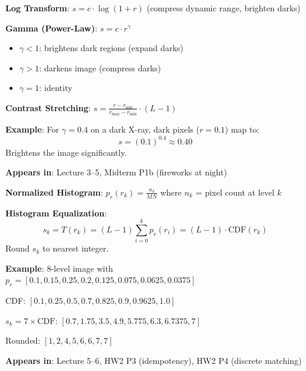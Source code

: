 \documentclass[10pt]{article}
\begin{document}

\begin{conceptbox}

\begin{formulabox}
\textbf{Log Transform}: $s = c \cdot \log(1 + r)$ \hfill (compress dynamic range, brighten darks)

\textbf{Gamma (Power-Law)}: $s = c \cdot r^\gamma$
\begin{itemize}[leftmargin=1.5em, itemsep=0pt, topsep=2pt]
    \item $\gamma < 1$: brightens dark regions (expand darks)
    \item $\gamma > 1$: darkens image (compress darks)
    \item $\gamma = 1$: identity
\end{itemize}

\textbf{Contrast Stretching}: $s = \frac{r - r_{\min}}{r_{\max} - r_{\min}} \cdot (L-1)$
\end{formulabox}

\begin{examplebox}
\textbf{Example}: For $\gamma = 0.4$ on a dark X-ray, dark pixels ($r=0.1$) map to:
\[
s = (0.1)^{0.4} \approx 0.40
\]
Brightens the image significantly.
\end{examplebox}

\textbf{Appears in}: Lecture 3--5, Midterm P1b (fireworks at night)

\end{conceptbox}


\begin{conceptbox}

\begin{formulabox}
\textbf{Normalized Histogram}: $p_r(r_k) = \frac{n_k}{MN}$ where $n_k$ = pixel count at level $k$

\textbf{Histogram Equalization}:
\[
s_k = T(r_k) = (L-1) \sum_{i=0}^{k} p_r(r_i) = (L-1) \cdot \text{CDF}(r_k)
\]
Round $s_k$ to nearest integer.
\end{formulabox}

\begin{examplebox}
\textbf{Example}: 8-level image with $p_r = [0.1, 0.15, 0.25, 0.2, 0.125, 0.075, 0.0625, 0.0375]$

CDF: $[0.1, 0.25, 0.5, 0.7, 0.825, 0.9, 0.9625, 1.0]$

$s_k = 7 \times \text{CDF}$: $[0.7, 1.75, 3.5, 4.9, 5.775, 6.3, 6.7375, 7]$

Rounded: $[1, 2, 4, 5, 6, 6, 7, 7]$
\end{examplebox}

\textbf{Appears in}: Lecture 5--6, HW2 P3 (idempotency), HW2 P4 (discrete matching)

\end{conceptbox}
\end{document}
